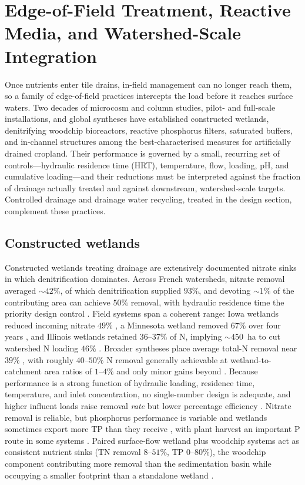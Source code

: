 \section{Edge-of-Field Treatment, Reactive Media, and Watershed-Scale Integration}

Once nutrients enter tile drains, in-field management can no longer reach
them, so a family of edge-of-field practices intercepts the load before it
reaches surface waters. Two decades of microcosm and column studies,
pilot- and full-scale installations, and global syntheses have established
constructed wetlands, denitrifying woodchip bioreactors, reactive
phosphorus filters, saturated buffers, and in-channel structures among the
best-characterised measures for artificially drained cropland. Their
performance is governed by a small, recurring set of controls---hydraulic
residence time (HRT), temperature, flow, loading, pH, and cumulative
loading---and their reductions must be interpreted against the fraction of
drainage actually treated and against downstream, watershed-scale targets.
Controlled drainage and drainage water recycling, treated in the design
section, complement these practices.

\subsection{Constructed wetlands}

Constructed wetlands treating drainage are extensively documented nitrate
sinks in which denitrification dominates. Across French watersheds, nitrate
removal averaged $\sim42\%$, of which denitrification supplied $93\%$, and
devoting $\sim1\%$ of the contributing area can achieve $50\%$ removal, with
hydraulic residence time the priority design control \parencite{Tournebize2017}.
Field systems span a coherent range: Iowa wetlands reduced incoming nitrate
$49\%$ \parencite{Drake2018}, a Minnesota wetland removed $67\%$ over four
years \parencite{Gordon2021}, and Illinois wetlands retained $36$--$37\%$ of
N, implying $\sim450$~ha to cut watershed N loading $46\%$
\parencite{Kovacic2006}. Broader syntheses place average total-N removal near
$39\%$ \parencite{Wang2025b}, with roughly $40$--$50\%$ N removal generally
achievable at wetland-to-catchment area ratios of $1$--$4\%$ and only minor
gains beyond \parencite{Mendes2021}. Because performance is a strong function
of hydraulic loading, residence time, temperature, and inlet concentration,
no single-number design is adequate, and higher influent loads raise removal
\emph{rate} but lower percentage efficiency
\parencite{Kadlec2012,Steidl2019,Mendes2021}. Nitrate removal is reliable, but
phosphorus performance is variable and wetlands sometimes export more TP than
they receive \parencite{Tanner2005,Tanner2011,Messer2021}, with plant harvest
an important P route in some systems \parencite{Lenhart2016}. Paired
surface-flow wetland plus woodchip systems act as consistent nutrient sinks
(TN removal $8$--$51\%$, TP $0$--$80\%$), the woodchip component contributing
more removal than the sedimentation basin while occupying a smaller footprint
than a standalone wetland \parencite{Pugliese2020}.

